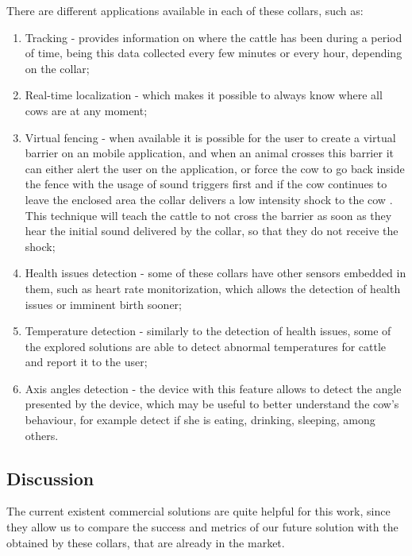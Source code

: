 There are different applications available in each of these collars, such as:
\begin{enumerate}
      \item Tracking - provides information on where the cattle has been during a period of
            time, being this data collected every few minutes or every hour, depending on the
            collar;
      \item Real-time localization - which makes it possible to always know where all cows
            are at any moment;
      \item Virtual fencing - when available it is possible for the user to create a virtual
            barrier on an mobile application, and when an animal crosses this barrier it can
            either alert the user on the application, or force the cow to go back inside the
            fence with the usage of sound triggers first and if the cow continues to leave the
            enclosed area the collar delivers a low intensity shock to the cow \cite{Golinski2022}.
            This technique will teach the cattle to not cross the barrier as soon as they hear
            the initial sound delivered by the collar, so that they do not receive the shock;
      \item Health issues detection - some of these collars have other sensors embedded in them,
            such as heart rate monitorization, which allows the detection of health issues or
            imminent birth sooner;
      \item Temperature detection - similarly to the detection of health issues, some of the
            explored solutions are able to detect abnormal temperatures for cattle and report
            it to the user;
      \item Axis angles detection - the device with this feature allows to detect the angle
            presented by the device, which may be useful to better understand the cow's
            behaviour, for example detect if she is eating, drinking, sleeping, among others.
\end{enumerate}

\subsection{Discussion}
\label{subsec:commercial_solutions_discussion}
The current existent commercial solutions are quite helpful for this work, since they allow us
to compare the success and metrics of our future solution with the obtained by these collars,
that are already in the market.

